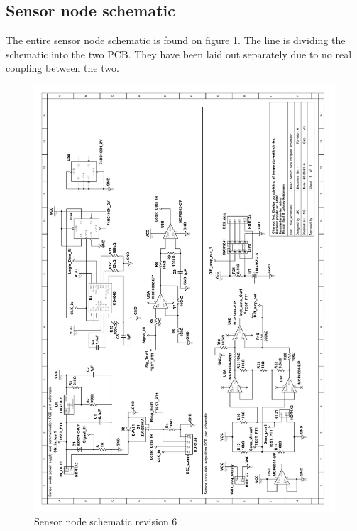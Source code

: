 \subsection{Sensor node schematic}
The entire sensor node schematic is found on figure \ref{Schematic:SN}. The line is dividing the schematic into the two PCB. They have been laid out separately due to no real coupling between the two.
\begin{figure}[H]
	\centering
	\includegraphics[width=1\textwidth]{billeder/SN_Schematic_rotated}
	\caption{Sensor node schematic revision 6}
	\label{Schematic:SN}
\end{figure}

